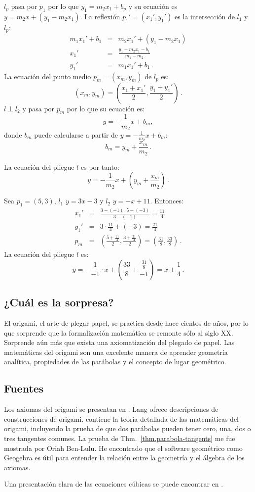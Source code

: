 $l_p$ pasa por $p_1$ por lo que $y_1=m_2x_1+b_p$ y su ecuación es $y=m_2x+(y_1-m_2x_1)$. La reflexión $p_1'=(x_1',y_1')$ es la intersección de $l_1$ y $l_p$:
\begin{eqnarray*}
m_1x_1'+b_1&=&m_2x_1'+(y_1-m_2x_1)\\
x_1'&=&\frac{y_1-m_2x_1-b_1}{m_1-m_2}\\
y_1'&=&m_1x_1'+b_1\,.
\end{eqnarray*}
La ecuación del punto medio $p_m=(x_m,y_m)$ de $l_p$ es:
\[
(x_m,y_m)=\left(\frac{x_1+x_1'}{2},\frac{y_1+y_1'}{2}\right)\,.
\]
$l\perp l_2$ y pasa por $p_m$ por lo que su ecuación es:
\[
y=-\frac{1}{m_2}x+b_m,
\]
donde $b_m$ puede calcularse a partir de $y=-\displaystyle\frac{1}{m_2}x+b_m$:
\[b_m=y_m+\frac{x_m}{m_2}\,.\]

La ecuación del pliegue $l$ es por tanto:
\[
y=-\frac{1}{m_2}x+\left(y_m+\displaystyle\frac{x_m}{m_2}\right)\,.
\]
\begin{example}
Sea $p_1=(5,3)$, $l_1$ $y=3x-3$ y $l_2$ $y=-x+11$. Entonces:
\begin{eqnarray*}
x_1'&=&\frac{3-(-1)\cdot 5-(-3)}{3-(-1)}=\frac{11}{4}\\
y_1'&=&3\cdot \frac{11}{4} + (-3)=\frac{21}{4}\\
p_m&=&\left(\frac{5+\displaystyle\frac{11}{4}}{2},\frac{3+\displaystyle\frac{21}{4}}{2}\right)=\left(\frac{31}{8},\frac{33}{8}\right)\,.
\end{eqnarray*}
La ecuación del pliegue $l$ es:
\[
y=-\frac{1}{-1}\cdot x+\left(\frac{33}{8}+\frac{\displaystyle\frac{31}{8}}{-1}\right)=x+\frac{1}{4}\,.
\]
\end{example}

\subsection*{¿Cuál es la sorpresa?}

El origami, el arte de plegar papel, se practica desde hace cientos de años, por lo que sorprende que la formalización matemática se remonte sólo al siglo XX. Sorprende aún más que exista una axiomatización del plegado de papel. Las matemáticas del origami son una excelente manera de aprender geometría analítica, propiedades de las parábolas y el concepto de lugar geométrico.



\subsection*{Fuentes}

Los axiomas del origami se presentan en \cite{wiki:hh-axioms}. Lang \cite{lang} ofrece descripciones de construcciones de origami. 
\cite[Cap.~10]{martin} contiene la teoría detallada de las matemáticas del origami, incluyendo la prueba de que dos parábolas pueden tener cero, una, dos o tres tangentes comunes. La prueba de Thm.~\ref{thm.parabola-tangents} me fue mostrada por Oriah Ben-Lulu. He encontrado que el software geométrico como Geogebra es útil para entender la relación entre la geometría y el álgebra de los axiomas.

Una presentación clara de las ecuaciones cúbicas se puede encontrar en \cite[Capítulos~1,\ 2]{jorg}.
